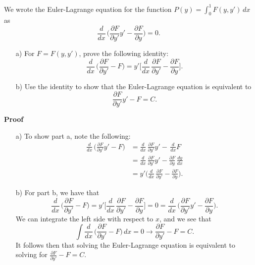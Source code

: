 \begin{exercise}{1}
We wrote the Euler-Lagrange equation for the function $P(y) = \int_0^1 F(y, y') \, dx$ as 
	$$\frac{d}{dx} \, \bigg(\frac{\partial{F}}{\partial{y'}}y' - \frac{\partial{F}}{\partial{y}}\bigg) = 0.$$

\begin{enumerate}
	\item[a)]
		For $F = F(y, y')$, prove the following identity:
			$$\frac{d}{dx} \, \bigg(\frac{\partial{F}}{\partial{y'}} - F \bigg) = y' \bigg[\frac{d}{dx} \, \frac{\partial{F}}{\partial{y'}} - \frac{\partial{F}}{\partial{y}}\bigg].$$
	\item[b)]
		Use the identity to show that the Euler-Lagrange equation is equivalent to 
			$$\frac{\partial{F}}{\partial{y'}}y' - F = C.$$

\end{enumerate}

\textbf{Proof}

\begin{enumerate}
	\item[a)] To show part a, note the following:
		\begin{align*}
			\frac{d}{dx} \, \bigg(\frac{\partial{F}}{\partial{y'}}y' - F \bigg) &= \frac{d}{dx} \, \frac{\partial{F}}{\partial{y'}}y' - \, \frac{d}{dx}F \\
			&= \frac{d}{dx} \, \frac{\partial{F}}{\partial{y'}}y' - \frac{\partial{F}}{\partial{y}} \, \frac{dy}{dx} \\
			&= y' \bigg(\frac{d}{dx} \, \frac{\partial{F}}{\partial{y'}} - \frac{\partial{F}}{\partial{y}}\bigg).
		\end{align*}

	\item[b)] For part b, we have that 
		$$\frac{d}{dx} \, \bigg(\frac{\partial{F}}{\partial{y'}} - F \bigg) = y' \bigg[\frac{d}{dx} \, \frac{\partial{F}}{\partial{y'}} - \frac{\partial{F}}{\partial{y}}\bigg] = 0 = \frac{d}{dx} \, \bigg(\frac{\partial{F}}{\partial{y'}}y' - \frac{\partial{F}}{\partial{y}}\bigg).$$
		We can integrate the left side with respect to $x$, and we see that 
			$$\int \frac{d}{dx} \, \bigg(\frac{\partial{F}}{\partial{y'}} - F \bigg) \, dx = 0 \rightarrow \frac{\partial{F}}{\partial{y'}} - F = C.$$
		It follows then that solving the Euler-Lagrange equation is equivalent to solving for $ \frac{\partial{F}}{\partial{y'}} - F = C.$

\end{enumerate}
\end{exercise}
